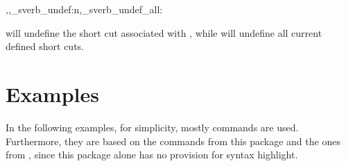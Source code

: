 \documentclass[10pt]{article}
\begin{document}
\begin{codedescribe}{\cvSVerbUndef,\cvSVerbUndefAll,\codeverb_sverb_undef:n,\codeverb_sverb_undef_all:}
\begin{codesyntax}%
\tsmacro{\cvSVerbUndefAll}{}
\end{codesyntax}
 will undefine the short cut associated with , while  will undefine all current defined short cuts.
\end{codedescribe}



\section{Examples}

In the following examples, for simplicity, mostly \LaTeXe{} commands are used. Furthermore, they are based on the commands from this package and the ones from , since this package alone has no provision for syntax highlight.



\printbibliography
\end{document}
